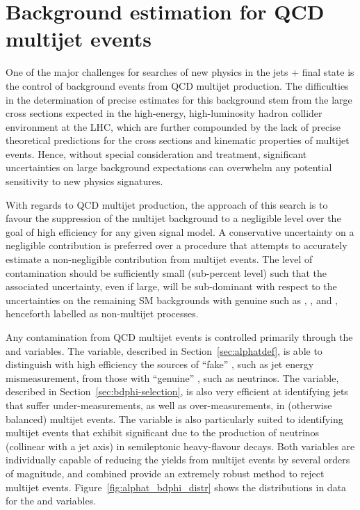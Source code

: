 \def\rmhtmet{\mbox{$\mathcal{R}$}\xspace}

\newpage
\section{Background estimation for QCD multijet events \label{sec:qcd}}

One of the major challenges for searches of new physics in the jets +
\met final state is the control of background events from QCD multijet
production. The difficulties in the determination of precise estimates
for this background stem from the large cross sections expected in the
high-energy, high-luminosity hadron collider environment at the LHC,
which are further compounded by the lack of precise theoretical
predictions for the cross sections and kinematic properties of
multijet events. Hence, without special consideration and treatment,
significant uncertainties on large background expectations can
overwhelm any potential sensitivity to new physics signatures.

With regards to QCD multijet production, the approach of this search
is to favour the suppression of the multijet background to a
negligible level over the goal of high efficiency for any given signal
model. A conservative uncertainty on a negligible contribution is
preferred over a procedure that attempts to accurately estimate a
non-negligible contribution from multijet events. The level of
contamination should be sufficiently small (\ie sub-percent level)
such that the associated uncertainty, even if large, will be
sub-dominant with respect to the uncertainties on the remaining SM
backgrounds with genuine \met such as \wj, \znunu, and \ttbar,
henceforth labelled as non-multijet processes.

Any contamination from QCD multijet events is controlled primarily
through the \alphat and \bdphi variables. The \alphat variable,
described in Section~\ref{sec:alphatdef}, is able to distinguish with
high efficiency the sources of ``fake'' \met, such as jet energy
mismeasurement, from those with ``genuine'' \met, such as neutrinos.
The \bdphi variable, described in Section~\ref{sec:bdphi-selection},
is also very efficient at identifying jets that suffer
under-measurements, as well as over-measurements, in (otherwise
balanced) multijet events. The variable is also particularly suited to
identifying multijet events that exhibit significant \met due to the
production of neutrinos (collinear with a jet axis) in semileptonic
heavy-flavour decays. Both variables are individually capable of
reducing the yields from multijet events by several orders of
magnitude, and combined provide an extremely robust method to reject
multijet events. Figure~\ref{fig:alphat_bdphi_distr} shows the
distributions in data for the \alphat and \bdphi variables.

